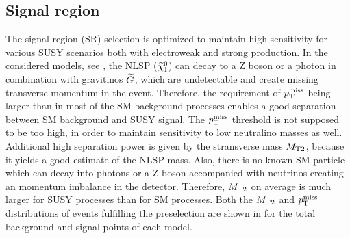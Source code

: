 \subsection{Signal region}\label{sec:SRSelection}
The signal region (SR) selection is optimized to maintain high sensitivity for various SUSY scenarios both with electroweak and strong production. In the considered models, see , the NLSP ($\widetilde{\chi}^{0}_{1}$) can decay to a Z boson or a photon in combination with gravitinos $\widetilde{G}$, which are undetectable and create missing transverse momentum in the event. Therefore, the requirement of $p_{\mathrm{T}}^\text{miss}$ being larger than in most of the SM background processes enables a good separation between SM background and SUSY signal. The $p_{\mathrm{T}}^\text{miss}$ threshold is not supposed to be too high, in order to maintain sensitivity to low neutralino masses as well.
Additional high separation power is given by the stransverse mass $M_{\mathrm{T2}}$, because it yields a good estimate of the NLSP mass. Also, there is no known SM particle which can decay into photons or a Z boson accompanied with neutrinos creating an momentum imbalance in the detector. Therefore, $M_{\mathrm{T2}}$ on average is much larger for SUSY processes than for SM processes. Both the $M_{\mathrm{T2}}$ and $p_{\mathrm{T}}^\text{miss}$ distributions of events fulfilling the preselection are shown in  for the total background and signal points of each model.
